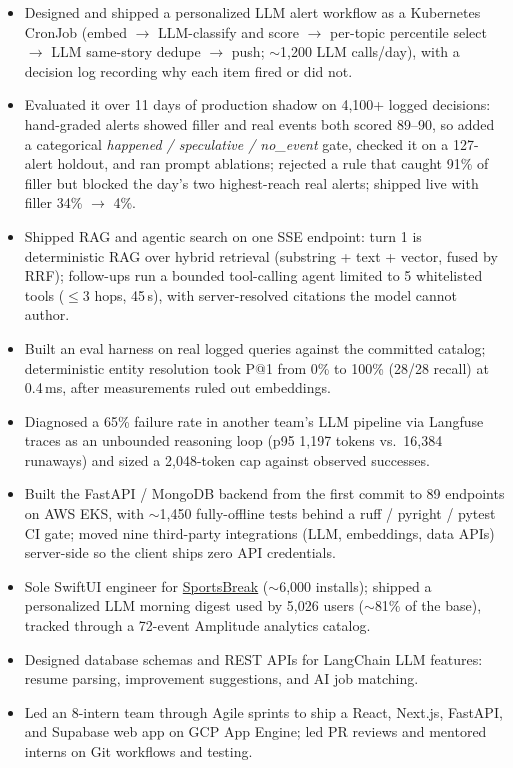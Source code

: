\documentclass[11pt, letterpaper]{article}
\begin{document}
\begin{itemize}
  \item Designed and shipped a personalized LLM alert workflow as a Kubernetes CronJob (embed $\to$ LLM-classify and score $\to$ per-topic percentile select $\to$ LLM same-story dedupe $\to$ push; $\sim$1{,}200 LLM calls/day), with a decision log recording why each item fired or did not.
  \item Evaluated it over 11 days of production shadow on 4{,}100+ logged decisions: hand-graded alerts showed filler and real events both scored 89--90, so added a categorical \textit{happened / speculative / no\_event} gate, checked it on a 127-alert holdout, and ran prompt ablations; rejected a rule that caught 91\% of filler but blocked the day's two highest-reach real alerts; shipped live with filler 34\% $\to$ 4\%.
  \item Shipped RAG and agentic search on one SSE endpoint: turn 1 is deterministic RAG over hybrid retrieval (substring + text + vector, fused by RRF); follow-ups run a bounded tool-calling agent limited to 5 whitelisted tools ($\le$3 hops, 45\,s), with server-resolved citations the model cannot author.
  \item Built an eval harness on real logged queries against the committed catalog; deterministic entity resolution took P@1 from 0\% to 100\% (28/28 recall) at 0.4\,ms, after measurements ruled out embeddings.
  \item Diagnosed a 65\% failure rate in another team's LLM pipeline via Langfuse traces as an unbounded reasoning loop (p95 1{,}197 tokens vs.\ 16{,}384 runaways) and sized a 2{,}048-token cap against observed successes.
  \item Built the FastAPI / MongoDB backend from the first commit to 89 endpoints on AWS EKS, with $\sim$1{,}450 fully-offline tests behind a ruff / pyright / pytest CI gate; moved nine third-party integrations (LLM, embeddings, data APIs) server-side so the client ships zero API credentials.
  \item Sole SwiftUI engineer for \href{https://apps.apple.com/app/id6762649287}{SportsBreak} ($\sim$6{,}000 installs); shipped a personalized LLM morning digest used by 5{,}026 users ($\sim$81\% of the base), tracked through a 72-event Amplitude analytics catalog.
\end{itemize}

\vspace{0.5pt}
\begin{itemize}
  \item Designed database schemas and REST APIs for LangChain LLM features: resume parsing, improvement suggestions, and AI job matching.
  \item Led an 8-intern team through Agile sprints to ship a React, Next.js, FastAPI, and Supabase web app on GCP App Engine; led PR reviews and mentored interns on Git workflows and testing.
\end{itemize}
\end{document}
